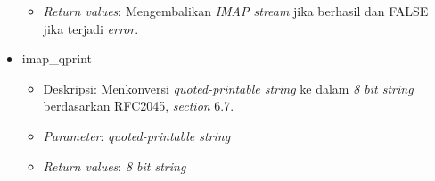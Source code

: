 \begin{itemize}
\begin{itemize}
\begin{itemize}
\end{itemize}
\item \textit{Return values}: Mengembalikan \textit{IMAP stream} jika berhasil dan FALSE jika terjadi \textit{error}.
\end{itemize}
 
\item imap\_qprint
\begin{itemize}
\item Deskripsi: Menkonversi \textit{quoted-printable string} ke dalam \textit{8 bit string} berdasarkan RFC2045, \textit{section} 6.7.
\item \textit{Parameter}: \textit{quoted-printable string}
\item \textit{Return values}: \textit{8 bit string}
\end{itemize}
 

\end{itemize}

